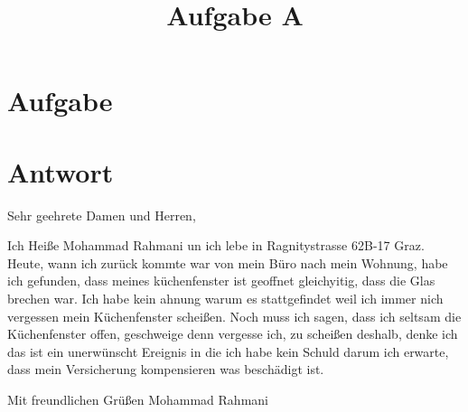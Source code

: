 \documentclass[a4paper]{article}
\title{Aufgabe A}
\date{}
\begin{document}
    \maketitle
    \section{Aufgabe}
    
    \section{Antwort}
     Sehr geehrete Damen und Herren,
    
    Ich Heiße Mohammad Rahmani  un ich lebe in Ragnitystrasse 62B-17 Graz. Heute, wann ich zurück kommte war von mein Büro nach mein Wohnung, habe ich gefunden, dass meines küchenfenster ist geoffnet gleichyitig, dass die Glas brechen war. Ich habe kein ahnung warum es stattgefindet weil ich immer nich vergessen mein Küchenfenster scheißen. Noch muss ich sagen, dass ich seltsam die Küchenfenster offen, geschweige denn vergesse ich, zu scheißen deshalb, denke ich das ist ein unerwünscht Ereignis in die ich habe kein Schuld darum ich erwarte, dass mein Versicherung kompensieren was beschädigt ist.
    
    Mit freundlichen Grüßen
    Mohammad Rahmani
    
\end{document}
